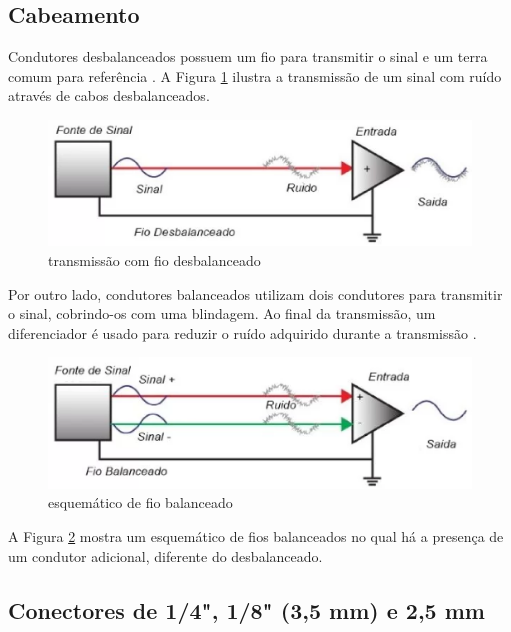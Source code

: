 \subsection{Cabeamento}

Condutores desbalanceados possuem um fio para transmitir o sinal e um terra comum para referência \cite{bartlett}. A Figura \ref{fig12} ilustra a transmissão de um sinal com ruído através de cabos desbalanceados.

\begin{figure}[h]
	\centering
    \includegraphics[scale=0.4]{figuras/fig11.eps}
	\caption{transmissão com fio desbalanceado \cite{proaudiospQualDiferena}}
	\label{fig12}
\end{figure}

Por outro lado, condutores balanceados utilizam dois condutores para transmitir o sinal, cobrindo-os com uma blindagem. Ao final da transmissão, um diferenciador é usado para reduzir o ruído adquirido durante a transmissão \cite{bartlett}.

\begin{figure}[h]
	\centering
    \includegraphics[scale=0.4]{figuras/fig12.eps}
	\caption{esquemático de fio balanceado \cite{proaudiospQualDiferena}}
	\label{fig11}
\end{figure}

A Figura \ref{fig11} mostra um esquemático de fios balanceados no qual há a presença de um condutor adicional, diferente do desbalanceado. 

\subsection{Conectores de 1/4", 1/8" (3,5 mm) e 2,5 mm}


